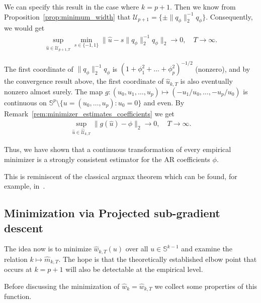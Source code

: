 We can specify this result in the case where $k=p+1$. Then we know from Proposition~\ref{prop:minimum_width} that $\mathcal{U}_{p+1}=\{\pm\|q_{\phi}\|_2^{-1}q_{\phi}\}$. Consequently, we would get
\begin{align*}
    \sup_{\hat{u}\in\hat{\mathcal{U}}_{p+1,T}}\min_{s\in\{-1,1\}}\|\hat{u}-s\|q_{\phi}\|_2^{-1}q_{\phi}\|_2\to0,\quad T\to\infty.
\end{align*}

The first coordinate of $\|q_{\phi}\|_2^{-1}q_{\phi}$ is $(1+\phi_1^2+\dots+\phi_p^2)^{-1/2}$ (nonzero), and by the convergence result above, the first coordinate of $\hat{u}_{k,T}$ is also eventually nonzero almost surely. The map $g:(u_0,u_1,\dots,u_p)\mapsto(-u_1/u_0,\dots,-u_p/u_0)$ is continuous on $\mathbb{S}^{p}\setminus\{u=(u_0,\dots,u_p):u_0=0\}$ and even. By Remark~\ref{rem:minimizer_estimates_coefficients} we get
\begin{align*}
    \sup_{\hat{u}\in\hat{\mathcal{U}}_{k,T}}\|g(\hat{u})-\phi\|_2\to0,\quad T\to\infty.
\end{align*}

Thus, we have shown that a continuous transformation of every empirical minimizer is a strongly consistent estimator for the AR coefficients $\phi$.

This is reminiscent of the classical argmax theorem which can be found, for example, in~\cite{Vaart_1998}.

\subsection{Minimization via Projected sub-gradient descent}

The idea now is to minimize $\hat{w}_{k,T}(u)$ over all $u\in\mathbb{S}^{k-1}$ and examine the relation $k\mapsto \hat{m}_{k,T}$. The hope is that the theoretically established elbow point that occurs at $k=p+1$ will also be detectable at the empirical level.

Before discussing the minimization of $\hat{w}_k=\hat{w}_{k,T}$ we collect some properties of this function.

